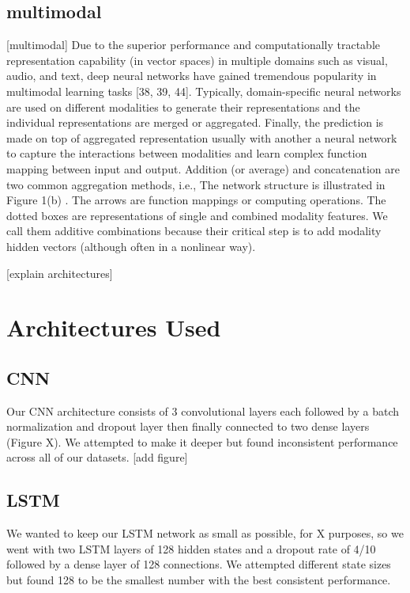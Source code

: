 \documentclass{turabian-thesis}
\begin{document}
\subsection{multimodal}

[multimodal]
Due to the superior performance and computationally tractable representation capability (in vector spaces) in multiple domains such as visual, audio, and text, deep neural networks have gained tremendous popularity in multimodal learning tasks [38, 39, 44]. Typically, domain-specific neural networks are used on different modalities to generate their representations and the individual representations are merged or aggregated. Finally, the prediction is made on top of aggregated representation usually with another a neural network to capture the interactions between modalities and learn complex function mapping between input and output. Addition (or average) and concatenation are two common aggregation methods, i.e.,
The network structure is illustrated in Figure 1(b) . The arrows are function mappings or computing operations. The dotted boxes are representations of single and combined modality features. We call them additive combinations because their critical step is to add modality hidden vectors (although often in a nonlinear way).


[explain architectures]

\section{Architectures Used}

\subsection{CNN}

Our CNN architecture consists of 3 convolutional layers each followed by a batch normalization and dropout layer then finally connected to two dense layers (Figure X). We attempted to make it deeper but found inconsistent performance across all of our datasets.
[add figure]
\subsection{LSTM}
We wanted to keep our LSTM network as small as possible, for X purposes, so we went with two LSTM layers of 128 hidden states and a dropout rate of 4/10  followed by a dense layer of 128 connections. We attempted different state sizes but found 128 to be the smallest number with the best consistent performance.
\end{document}
